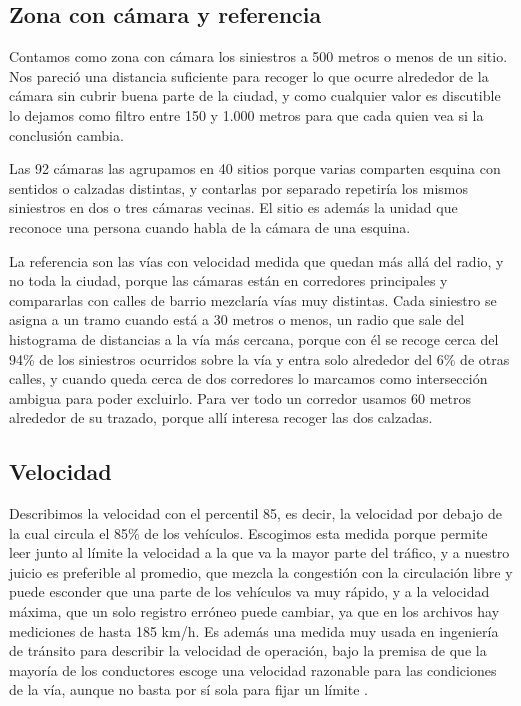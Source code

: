 \documentclass[10pt,a4paper]{article}
\begin{document}
\subsection{Zona con cámara y referencia}

Contamos como zona con cámara los siniestros a 500 metros o menos de un sitio. Nos pareció una distancia suficiente para recoger lo que ocurre alrededor de la cámara sin cubrir buena parte de la ciudad, y como cualquier valor es discutible lo dejamos como filtro entre 150 y 1.000 metros para que cada quien vea si la conclusión cambia.

Las 92 cámaras las agrupamos en 40 sitios porque varias comparten esquina con sentidos o calzadas distintas, y contarlas por separado repetiría los mismos siniestros en dos o tres cámaras vecinas. El sitio es además la unidad que reconoce una persona cuando habla de la cámara de una esquina.


La referencia son las vías con velocidad medida que quedan más allá del radio, y no toda la ciudad, porque las cámaras están en corredores principales y compararlas con calles de barrio mezclaría vías muy distintas. Cada siniestro se asigna a un tramo cuando está a 30 metros o menos, un radio que sale del histograma de distancias a la vía más cercana, porque con él se recoge cerca del 94\% de los siniestros ocurridos sobre la vía y entra solo alrededor del 6\% de otras calles, y cuando queda cerca de dos corredores lo marcamos como intersección ambigua para poder excluirlo. Para ver todo un corredor usamos 60 metros alrededor de su trazado, porque allí interesa recoger las dos calzadas.

\subsection{Velocidad}

Describimos la velocidad con el percentil 85, es decir, la velocidad por debajo de la cual circula el 85\% de los vehículos. Escogimos esta medida porque permite leer junto al límite la velocidad a la que va la mayor parte del tráfico, y a nuestro juicio es preferible al promedio, que mezcla la congestión con la circulación libre y puede esconder que una parte de los vehículos va muy rápido, y a la velocidad máxima, que un solo registro erróneo puede cambiar, ya que en los archivos hay mediciones de hasta 185 km/h. Es además una medida muy usada en ingeniería de tránsito para describir la velocidad de operación, bajo la premisa de que la mayoría de los conductores escoge una velocidad razonable para las condiciones de la vía, aunque no basta por sí sola para fijar un límite \cite{fhwa}.
\end{document}
